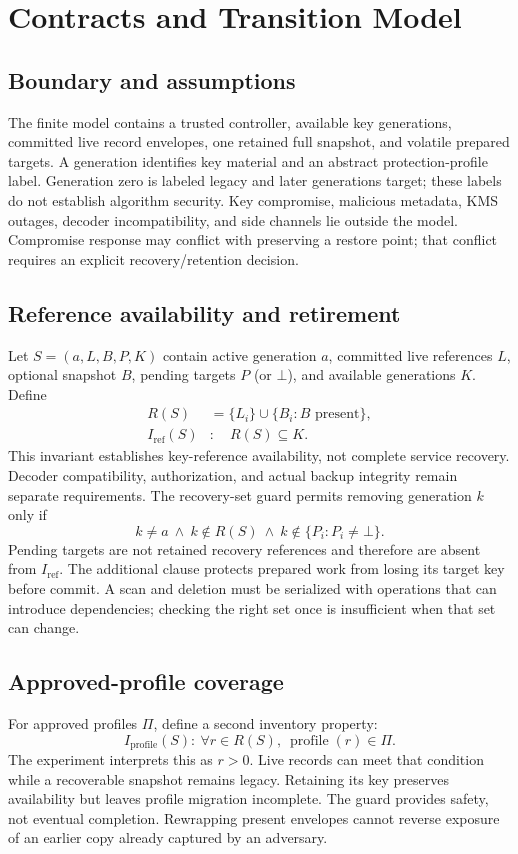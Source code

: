 \documentclass[10pt,conference]{IEEEtran}
\begin{document}
\section{Contracts and Transition Model}
\subsection{Boundary and assumptions}
The finite model contains a trusted controller, available key generations, committed live record envelopes, one retained full snapshot, and volatile prepared targets. A generation identifies key material and an abstract protection-profile label. Generation zero is labeled legacy and later generations target; these labels do not establish algorithm security. Key compromise, malicious metadata, KMS outages, decoder incompatibility, and side channels lie outside the model. Compromise response may conflict with preserving a restore point; that conflict requires an explicit recovery/retention decision.

\subsection{Reference availability and retirement}
Let $S=(a,L,B,P,K)$ contain active generation $a$, committed live references $L$, optional snapshot $B$, pending targets $P$ (or $\bot$), and available generations $K$. Define
\begin{align}
R(S)&=\{L_i\}\cup\{B_i:B\text{ present}\},\\
I_{\mathrm{ref}}(S)&:\quad R(S)\subseteq K.
\end{align}
This invariant establishes key-reference availability, not complete service recovery. Decoder compatibility, authorization, and actual backup integrity remain separate requirements. The recovery-set guard permits removing generation $k$ only if
\begin{equation}
k\ne a\ \land\ k\notin R(S)\ \land\ k\notin\{P_i:P_i\ne\bot\}.
\label{eq:guard}
\end{equation}
Pending targets are not retained recovery references and therefore are absent from $I_{\mathrm{ref}}$. The additional clause protects prepared work from losing its target key before commit. A scan and deletion must be serialized with operations that can introduce dependencies; checking the right set once is insufficient when that set can change.

\subsection{Approved-profile coverage}
For approved profiles $\Pi$, define a second inventory property:
\begin{equation}
I_{\mathrm{profile}}(S):\ \forall r\in R(S),\ \operatorname{profile}(r)\in\Pi.
\end{equation}
The experiment interprets this as $r>0$. Live records can meet that condition while a recoverable snapshot remains legacy. Retaining its key preserves availability but leaves profile migration incomplete. The guard provides safety, not eventual completion. Rewrapping present envelopes cannot reverse exposure of an earlier copy already captured by an adversary.
\end{document}

